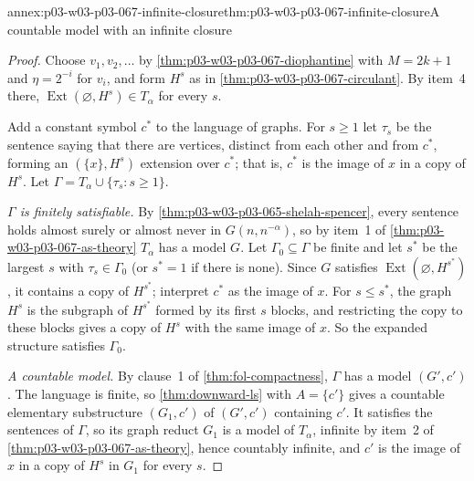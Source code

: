 \begin{annexitem}{annex:p03-w03-p03-067-infinite-closure}{thm:p03-w03-p03-067-infinite-closure}{A countable model with an infinite closure}
\begin{proof}
Choose \(v_1,v_2,\ldots\) by \cref{thm:p03-w03-p03-067-diophantine} with
\(M=2k+1\) and \(\eta=2^{-i}\) for \(v_i\), and form \(H^s\) as in
\cref{thm:p03-w03-p03-067-circulant}.  By item~4 there,
\(\operatorname{Ext}(\varnothing,H^s)\in T_\alpha\) for every \(s\).

Add a constant symbol \(c^\ast\) to the language of graphs.  For \(s\geq1\)
let \(\tau_s\) be the sentence saying that there are vertices, distinct from
each other and from \(c^\ast\), forming an \((\{x\},H^s)\) extension over
\(c^\ast\); that is, \(c^\ast\) is the image of \(x\) in a copy of \(H^s\).
Let \(\Gamma=T_\alpha\cup\{\tau_s:s\geq1\}\).

\emph{\(\Gamma\) is finitely satisfiable.}  By
\cref{thm:p03-w03-p03-065-shelah-spencer}, every sentence holds almost surely
or almost never in \(G(n,n^{-\alpha})\), so by item~1 of
\cref{thm:p03-w03-p03-067-as-theory} \(T_\alpha\) has a model \(G\).  Let
\(\Gamma_0\subseteq\Gamma\) be finite and let \(s^\ast\) be the largest
\(s\) with \(\tau_s\in\Gamma_0\) (or \(s^\ast=1\) if there is none).  Since
\(G\) satisfies \(\operatorname{Ext}(\varnothing,H^{s^\ast})\), it contains a
copy of \(H^{s^\ast}\); interpret \(c^\ast\) as the image of \(x\).  For
\(s\leq s^\ast\), the graph \(H^s\) is the subgraph of \(H^{s^\ast}\)
formed by its first \(s\) blocks, and restricting the copy to these blocks
gives a copy of \(H^s\) with the same image of \(x\).  So the expanded
structure satisfies \(\Gamma_0\).

\emph{A countable model.}  By clause~1 of \cref{thm:fol-compactness},
\(\Gamma\) has a model \((G',c')\).  The language is finite, so
\cref{thm:downward-ls} with \(A=\{c'\}\) gives a countable elementary
substructure \((G_1,c')\) of \((G',c')\) containing \(c'\).  It satisfies the
sentences of \(\Gamma\), so its graph reduct \(G_1\) is a model of
\(T_\alpha\), infinite by item~2 of \cref{thm:p03-w03-p03-067-as-theory},
hence countably infinite, and \(c'\) is the image of \(x\) in a copy of
\(H^s\) in \(G_1\) for every \(s\).


\end{proof}
\end{annexitem}
